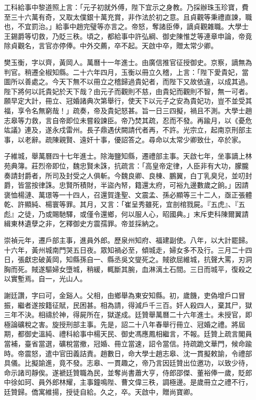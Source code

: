 \begin{pinyinscope}
工科給事中黎道照上言：「元子初就外傅，陛下宜示之身教。乃採辦珠玉珍寶，費至三十六萬有奇，又取太僕銀十萬充賞，非作法於初之意。且貞觀等秉禮直諫，職也，不宜罰治。」給事中趙完璧等亦言之。帝怒，奪諸臣俸，謫貞觀雜職。大學士王錫爵等切救，乃貶三秩。頃之，都給事中許弘綱、御史陳惟芝等連章申論，帝竟除貞觀名，言官亦停俸。中外交薦，卒不起。天啟中卒，贈太常少卿。

樊玉衡，字以齊，黃岡人。萬曆十一年進士。由廣信推官征授御史。京察，謫無為判官。稍遷全椒知縣。二十六年四月，玉衡以冊立久稽，上言：「陛下愛貴妃，當圖所以善處之。今天下無不以冊立之稽歸過貴妃者，而陛下又故依違，以成其過。陛下將何以託貴妃於天下哉？由元子而觀則不慈，由貴妃而觀則不智，無一可者。願早定大計，冊立、冠婚諸典次第舉行，使天下以元子之安為貴妃功，豈不並受其福，享令名無窮哉！」疏奏，帝及貴妃怒甚。旨一日三四擬，禍且不測。大學士趙志皋等力救，言自帝即位未嘗殺諫臣。帝乃焚其疏，忍而不發。再踰月，以《憂危竑議》連及，遂永戍雷州。長子鼎遇伏闕請代者再，不許。光宗立，起南京刑部主事，以老辭。疏陳親賢、遠奸十事，優詔答之。尋命以太常少卿致仕，卒於家。

子維城，舉萬曆四十七年進士。除海鹽知縣，遷禮部主事。天啟七年，坐事謫上林苑典簿。莊烈帝即位，魏忠賢未誅，抗疏言：「高皇帝定律，人臣非有大功，朦朧奏請封爵者，所司及封受之人俱斬。今魏良卿、良棟、鵬翼，白丁乳臭兒，並叨封爵，皆當按律誅。忠賢所積財，半盜內帑，籍還太府，可裕九邊數歲之餉。」因請褒恤楊漣、萬璟等一十四人，召還賀逢聖、文震孟、孫必顯等三十二人，亟正張體乾、許顯純、楊寰等罪。其月，又言：「崔呈秀雖死，宜剖棺戮屍。『五虎』、『五彪』之徒，乃或賜馳驛，或僅令還鄉，何以服人心，昭國典。」末斥吏科陳爾翼請緝東林遺孽之非，乞釋御史方震孺罪。帝並採納之。

崇禎元年，遷戶部主事，進員外郎。歷泉州知府、福建副使。八年，以大計罷歸。十六年，黃州城南門哭五日夜。眾知禍必至，傾城走，婦女多不及行。三月二十四日，張獻忠破黃岡，知縣孫自一、縣丞吳文燮死之。賊欲屈維城，抗聲大罵，刃洞胸而死。賊遂驅婦女墮城，稍緩，輒斷其腕，血淋漓土石間。三日而城平，復殺之以實塹焉。自一，光山人。

謝廷讚，字曰可，金谿人。父相，由鄉舉為東安知縣。初，歲饑，吏偽增戶口冒振，繼者遂按籍征賦，民困甚。相為請，得減戶千三百。奸人殺四人，棄其尸，獄三年不決。相禱於神，得屍所在，獄遂成。廷贊舉萬曆二十六年進士。未授官，即極論礦稅之害。旋授刑部主事。先是，詔二十八年春舉行冊立、冠婚之禮。將屆期，都御史溫純、禮科給事中楊天民、御史馮應鳳相繼言，不報。廷贊上疏言閣員當補，臺省當選，礦稅當撤，冠婚、冊立當速，詔令當信。持疏跪文華門，候命踰時。帝震怒，遣中官田義詰責。趙數日，命大學士趙志皋、沈一貫擬敕諭，令禮部具儀。比擬諭進，竟不發。志皋、一貫趣之，帝乃言因廷贊出位邀功，以致少待，命示諸司靜俟。遂褫廷贊職為民，並奪尚書蕭大亨，侍郎邵傑、董裕俸一歲，貶郎中徐如珂、員外郎林耀，主事鐘鳴陛、曹文偉三秩，調極邊。是歲冊立之禮不行，廷贊歸。僑寓維揚，授徒自給。久之，卒。天啟中，贈尚寶卿。


\end{pinyinscope}
